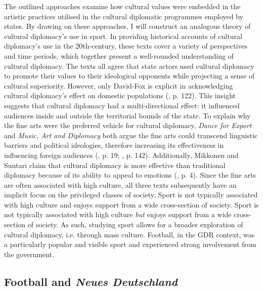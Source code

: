 The outlined approaches examine how cultural values were embedded in the artistic practices utilised in the cultural diplomatic programmes employed by states. By drawing on these approaches, I will construct an analogous theory of cultural diplomacy’s use in sport. In providing historical accounts of cultural diplomacy’s use in the 20th-century, these texts cover a variety of perspectives and time periods, which together present a well-rounded understanding of cultural diplomacy. The texts all agree that state actors used cultural diplomacy to promote their values to their ideological opponents while projecting a sense of cultural superiority. However, only David-Fox is explicit in acknowledging cultural diplomacy’s effect on domestic populations (\citeyear{david-fox2011}, p. 122). This insight suggests that cultural diplomacy had a multi-directional effect: it influenced audiences inside and outside the territorial bounds of the state. To explain why the fine arts were the preferred vehicle for cultural diplomacy, \textit{Dance for Export} and \textit{Music, Art and Diplomacy} both argue the fine arts could transcend linguistic barriers and political ideologies, therefore increasing its effectiveness in influencing foreign audiences (\cite{prevots1998}, p. 19; \cite{gonçalves2016}, p. 142). Additionally, Mikkonen and Suutari claim that cultural diplomacy is more effective than traditional diplomacy because of its ability to appeal to emotions (\citeyear{mikkonensuutari2016}, p. 4). Since the fine arts are often associated with high culture, all three texts subsequently have an implicit focus on the privileged classes of society. Sport is not typically associated with high culture and enjoys support from a wide cross-section of society. Sport is not typically associated with high culture \textit{but} enjoys support from a wide cross-section of society. As such, studying sport allows for a broader exploration of cultural diplomacy, i.e. through mass culture. Football, in the GDR context, was a particularly popular and visible sport and experienced strong involvement from the government.

\subsection*{Football and \textit{Neues Deutschland}}

